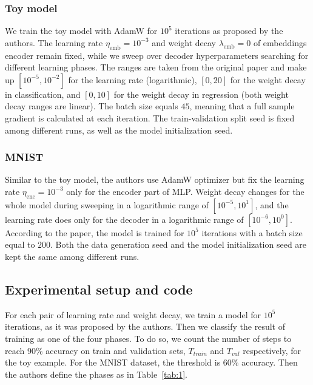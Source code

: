 \subsubsection{Toy model}  We train the toy model with AdamW \cite{adamw} for $10^5$ iterations as proposed by the authors. The learning rate $\eta_{\text{emb}} = 10^{-3}$ and weight decay ${\lambda}_{\text{emb}} = 0$ of embeddings encoder remain fixed, while we sweep over decoder hyperparameters searching for different learning phases. The ranges are taken from the original paper and make up $[10^{-5}, 10^{-2}]$ for the learning rate (logarithmic), $[0, 20]$ for the weight decay in classification, and $[0, 10]$ for the weight decay in regression (both weight decay ranges are linear). The batch size equals $45$, meaning that a full sample gradient is calculated at each iteration. The train-validation split seed is fixed among different runs, as well as the model initialization seed.

\subsubsection{MNIST}
Similar to the toy model, the authors use AdamW optimizer but fix the learning rate $\eta_{\text{enc}} = 10^{-3}$ only for the encoder part of MLP. Weight decay changes for the whole model during sweeping in a logarithmic range of $[10^{-5}, 10^{1}]$, and the learning rate does only for the decoder in a logarithmic range of $[10^{-6}, 10^{0}]$. According to the paper, the model is trained for $10^5$ iterations with a batch size equal to $200$. Both the data generation seed and the model initialization seed are kept the same among different runs.

\subsection{Experimental setup and code}
For each pair of learning rate and weight decay, we train a model for $10^5$ iterations, as it was proposed by the authors. Then we classify the result of training as one of the four phases. To do so, we count the number of steps to reach 90\% accuracy on train and validation sets, $T_{train}$ and $T_{val}$ respectively, for the toy example. For the MNIST dataset, the threshold is 60\% accuracy. Then the authors define the phases as in Table~\ref{tab:1}.

